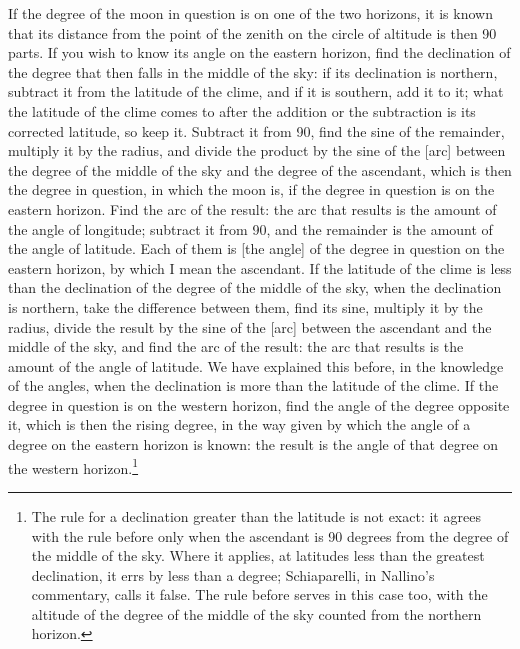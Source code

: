 \documentclass[11pt]{article}
\begin{document}
\par If the degree of the moon in question is on one of the two horizons, it is known that its distance from the point of the zenith on the circle of altitude is then 90 parts. If you wish to know its angle on the eastern horizon, find the declination of the degree that then falls in the middle of the sky: if its declination is northern, subtract it from the latitude of the clime, and if it is southern, add it to it; what the latitude of the clime comes to after the addition or the subtraction is its corrected latitude, so keep it. Subtract it from 90, find the sine of the remainder, multiply it by the radius, and divide the product by the sine of the [arc] between the degree of the middle of the sky and the degree of the ascendant, which is then the degree in question, in which the moon is, if the degree in question is on the eastern horizon. Find the arc of the result: the arc that results is the amount of the angle of longitude; subtract it from 90, and the remainder is the amount of the angle of latitude. Each of them is [the angle] of the degree in question on the eastern horizon, by which I mean the ascendant. If the latitude of the clime is less than the declination of the degree of the middle of the sky, when the declination is northern, take the difference between them, find its sine, multiply it by the radius, divide the result by the sine of the [arc] between the ascendant and the middle of the sky, and find the arc of the result: the arc that results is the amount of the angle of latitude. We have explained this before, in the knowledge of the angles, when the declination is more than the latitude of the clime. If the degree in question is on the western horizon, find the angle of the degree opposite it, which is then the rising degree, in the way given by which the angle of a degree on the eastern horizon is known: the result is the angle of that degree on the western horizon.\footnote{The rule for a declination greater than the latitude is not exact: it agrees with the rule before only when the ascendant is 90 degrees from the degree of the middle of the sky. Where it applies, at latitudes less than the greatest declination, it errs by less than a degree; Schiaparelli, in Nallino's commentary, calls it false. The rule before serves in this case too, with the altitude of the degree of the middle of the sky counted from the northern horizon.}\par
\end{document}
